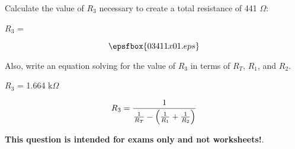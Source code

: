

Calculate the value of $R_3$ necessary to create a total resistance of 441 $\Omega$:

\vskip 10pt

$R_3$ = 

$$\epsfbox{03411x01.eps}$$

Also, write an equation solving for the value of $R_3$ in terms of $R_T$, $R_1$, and $R_2$.







$R_3$ = 1.664 k$\Omega$

$$R_3 = {1 \over { {1 \over R_T} - \left( {1 \over R_1} + {1 \over R_2} \right)}}$$







{\bf This question is intended for exams only and not worksheets!}.



